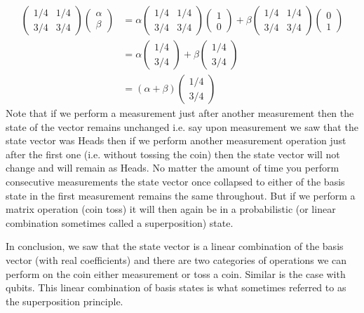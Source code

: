\begin{align*}
\begin{pmatrix} 1/4 & 1/4 \\3/4 & 3/4 \end{pmatrix} \begin{pmatrix} \alpha \\ \beta \end{pmatrix} &= \alpha \begin{pmatrix} 1/4 & 1/4 \\3/4 & 3/4 \end{pmatrix} \begin{pmatrix} 1 \\ 0 \end{pmatrix} + \beta \begin{pmatrix} 1/4 & 1/4 \\3/4 & 3/4 \end{pmatrix} \begin{pmatrix} 0 \\ 1 \end{pmatrix}\\
&= \alpha \begin{pmatrix} 1/4 \\ 3/4 \end{pmatrix} + \beta \begin{pmatrix} 1/4 \\ 3/4 \end{pmatrix}\\
&=(\alpha + \beta) \begin{pmatrix} 1/4 \\ 3/4 \end{pmatrix}
\end{align*}
Note that if we perform a measurement just after another measurement then the state of the vector remains unchanged i.e. say upon measurement we saw that the state vector was Heads then if we perform another measurement operation just after the first one (i.e. without tossing the coin) then the state vector will not change and will remain as Heads. No matter the amount of time you perform consecutive measurements the state vector once collapsed to either of the basis state in the first measurement remains the same throughout. But if we perform a matrix operation (coin toss) it will then again be in a probabilistic (or linear combination sometimes called a superposition) state.

In conclusion, we saw that the state vector is a linear combination of the basis vector (with real coefficients) and there are two categories of operations we can perform on the coin either measurement or toss a coin. Similar is the case with qubits. This linear combination of basis states is what sometimes referred to as the superposition principle.

